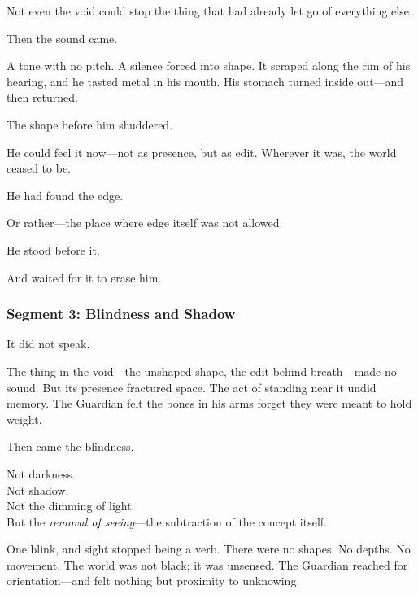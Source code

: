 \documentclass[9pt]{article}
\begin{document}
\vspace{0.5em}
Not even the void could stop the thing that had already let go of everything else.

\vspace{0.5em}
Then the sound came.

\vspace{0.5em}
A tone with no pitch. A silence forced into shape. It scraped along the rim of his hearing, and he tasted metal in his mouth. His stomach turned inside out---and then returned.

\vspace{0.5em}
The shape before him shuddered.

\vspace{0.5em}
He could feel it now---not as presence, but as edit. Wherever it was, the world ceased to be.

\vspace{0.5em}
He had found the edge.

\vspace{0.5em}
Or rather---the place where edge itself was not allowed.

\vspace{0.5em}
He stood before it.

\vspace{0.5em}
And waited for it to erase him.

\newpage

\subsubsection*{Segment 3: Blindness and Shadow}

It did not speak.

\vspace{0.5em}
The thing in the void---the unshaped shape, the edit behind breath---made no sound. But its presence fractured space. The act of standing near it undid memory. The Guardian felt the bones in his arms forget they were meant to hold weight.

\vspace{0.5em}
Then came the blindness.

\vspace{0.5em}
Not darkness.\\
Not shadow.\\
Not the dimming of light.\\
But the \textit{removal of seeing}---the subtraction of the concept itself.

\vspace{0.5em}
One blink, and sight stopped being a verb. There were no shapes. No depths. No movement. The world was not black; it was unsensed. The Guardian reached for orientation---and felt nothing but proximity to unknowing.
\end{document}
